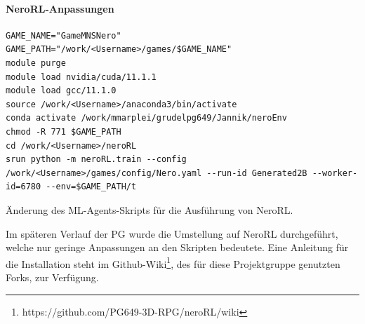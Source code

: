 \paragraph{NeroRL-Anpassungen}
\begin{listing}
	\begin{verbatim}
GAME_NAME="GameMNSNero"
GAME_PATH="/work/<Username>/games/$GAME_NAME"
module purge
module load nvidia/cuda/11.1.1
module load gcc/11.1.0
source /work/<Username>/anaconda3/bin/activate
conda activate /work/mmarplei/grudelpg649/Jannik/neroEnv
chmod -R 771 $GAME_PATH
cd /work/<Username>/neroRL  
srun python -m neroRL.train --config /work/<Username>/games/config/Nero.yaml --run-id Generated2B --worker-id=6780 --env=$GAME_PATH/t
	\end{verbatim}
	\caption{Änderung des ML-Agents-Skripts für die Ausführung von NeroRL.}
	\label{prog:neroRlChanges}
\end{listing}
Im späteren Verlauf der PG wurde die Umstellung auf NeroRL durchgeführt, welche nur geringe Anpassungen an den Skripten bedeutete. Eine Anleitung für die Installation steht im Github-Wiki\footnote{https://github.com/PG649-3D-RPG/neroRL/wiki}, des für diese Projektgruppe genutzten Forks, zur Verfügung.



